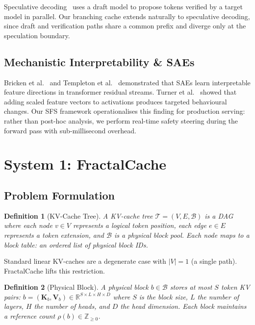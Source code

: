 \documentclass[10pt,twocolumn]{article}
\newtheorem{definition}{Definition}
\begin{document}
Speculative decoding~\cite{leviathan2023fast, chen2023accelerating} uses a draft model to propose tokens verified by a target model in parallel. Our branching cache extends naturally to speculative decoding, since draft and verification paths share a common prefix and diverge only at the speculation boundary.

\subsection{Mechanistic Interpretability \& SAEs}

Bricken et al.~\cite{bricken2023monosemanticity} and Templeton et al.~\cite{templeton2024scaling} demonstrated that SAEs learn interpretable feature directions in transformer residual streams. Turner et al.~\cite{turner2023activation} showed that adding scaled feature vectors to activations produces targeted behavioural changes. Our SFS framework operationalises this finding for production serving: rather than post-hoc analysis, we perform real-time safety steering during the forward pass with sub-millisecond overhead.

\section{System 1: FractalCache}

\subsection{Problem Formulation}

\begin{definition}[KV-Cache Tree]
A KV-cache tree $\mathcal{T} = (V, E, \mathcal{B})$ is a DAG where each node $v \in V$ represents a logical token position, each edge $e \in E$ represents a token extension, and $\mathcal{B}$ is a physical block pool. Each node maps to a \emph{block table}: an ordered list of physical block IDs.
\end{definition}

Standard linear KV-caches are a degenerate case with $|V| = 1$ (a single path). FractalCache lifts this restriction.

\begin{definition}[Physical Block]
A physical block $b \in \mathcal{B}$ stores at most $S$ token KV pairs: $b = (\mathbf{K}_b, \mathbf{V}_b) \in \mathbb{R}^{S \times L \times H \times D}$ where $S$ is the block size, $L$ the number of layers, $H$ the number of heads, and $D$ the head dimension. Each block maintains a reference count $\rho(b) \in \mathbb{Z}_{\geq 0}$.
\end{definition}
\end{document}

